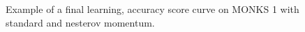 \begin{appendices}
            \begin{figure}[H]
                \centering
                \begin{subfigure}{0.40\textwidth}
                    \caption{}
                    \label{fig:monks_1_MSE_SGD}
                \end{subfigure}
                \begin{subfigure}{0.40\textwidth}
                    \caption{}
                    \label{fig:monks_1_ACC_SGD}
                \end{subfigure}
                \caption{Example of a final learning, accuracy score curve on MONKS 1 with standard and nesterov momentum.}
                \label{fig:monks_1_SGD}
            \end{figure}


\end{appendices}
